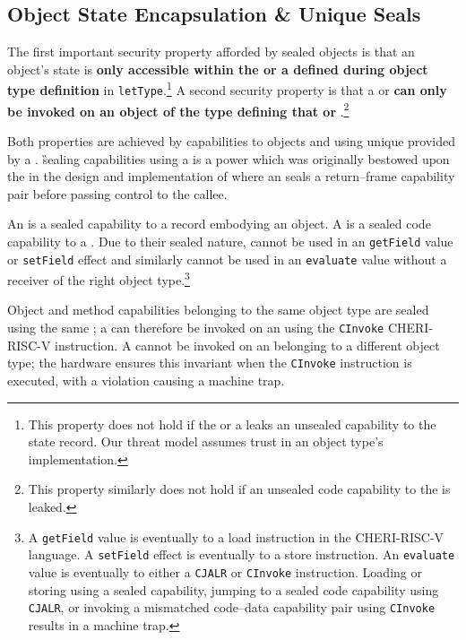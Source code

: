 \documentclass[main.tex]{subfiles}
\begin{document}
\subsection{Object State Encapsulation \& Unique Seals} \label{sct:obj-sec}
The first important security property afforded by sealed objects is that an object's state is \textbf{only accessible within the  or a  defined during object type definition} in \texttt{letType}.\footnote{This property does not hold if the  or a  leaks an unsealed capability to the state record. Our threat model assumes trust in an object type's implementation.} A second security property is that a  or  \textbf{can only be invoked on an object of the type defining that  or }.\footnote{This property similarly does not hold if an unsealed code capability to the  is leaked.}

Both properties are achieved by  capabilities to objects and  using unique  provided by a . \G{sealing} capabilities using a  is a power which was originally bestowed upon the  in the design and implementation of  where an  seals a return–frame capability pair before passing control to the callee.

An \textbf{} is a sealed capability to a record embodying an object. A \textbf{} is a sealed code capability to a . Due to their sealed nature,  cannot be used in an \texttt{getField} value or \texttt{setField} effect and similarly  cannot be used in an \texttt{evaluate} value without a receiver of the right object type.\footnote{A \texttt{getField} value is eventually \lowered{} to a load instruction in the CHERI-RISC-V language. A \texttt{setField} effect is eventually \lowered{} to a store instruction. An \texttt{evaluate} value is eventually \lowered{} to either a \texttt{CJALR} or \texttt{CInvoke} instruction. Loading or storing using a sealed capability, jumping to a sealed code capability using \texttt{CJALR}, or invoking a mismatched code–data capability pair using \texttt{CInvoke} results in a machine trap.}

Object and method capabilities belonging to the same object type are sealed using the same ; a  can therefore be invoked on an  using the \texttt{CInvoke} CHERI-RISC-V instruction. A  cannot be invoked on an  belonging to a different object type; the hardware ensures this invariant when the \texttt{CInvoke} instruction is executed, with a violation causing a machine trap.
\end{document}

